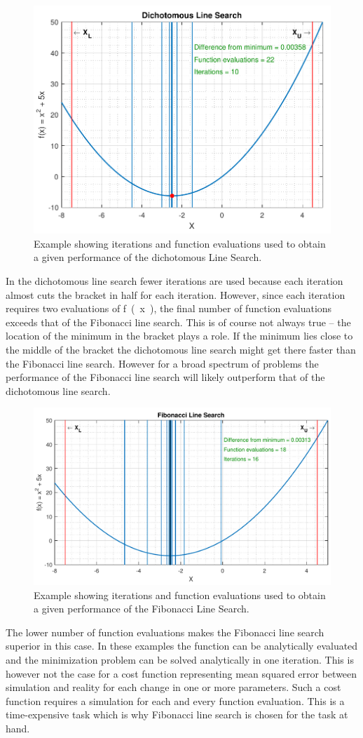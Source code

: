 \begin{figure}[H] 
	\centering
	\includegraphics[width=.65\textwidth]{figures/dichotomousLineSearchPerformance}
	\caption{Example showing iterations and function evaluations used to obtain a given performance of the dichotomous Line Search.}
	\label{dichotomousLineSearchPerformance}
\end{figure}\vspace{-18pt}
%
In the dichotomous line search fewer iterations are used because each iteration almost cuts the bracket in half for each iteration. However, since each iteration requires two evaluations of \si{f(x)}, the final number of function evaluations exceeds that of the Fibonacci line search. This is of course not always true -- the location of the minimum in the bracket plays a role. If the minimum lies close to the middle of the bracket the dichotomous line search might get there faster than the Fibonacci line search. However for a broad spectrum of problems the performance of the Fibonacci line search will likely outperform that of the dichotomous line search.

\begin{figure}[H] 
	\centering
	\includegraphics[width=.65\textwidth]{figures/fibonacciLineSearchPerformance}
	\caption{Example showing iterations and function evaluations used to obtain a given performance of the Fibonacci Line Search.}
	\label{fibonacciLineSearchPerformance}
\end{figure}\vspace{-18pt}
%
The lower number of function evaluations makes the Fibonacci line search superior in this case. In these examples the function can be analytically evaluated and the minimization problem can be solved analytically in one iteration. This is however not the case for a cost function representing mean squared error between simulation and reality for each change in one or more parameters. Such a cost function requires a simulation for each and every function evaluation. This is a time-expensive task which is why Fibonacci line search is chosen for the task at hand.